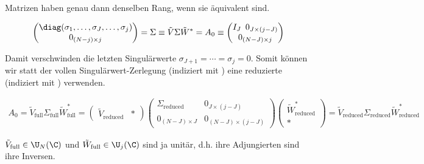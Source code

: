 Matrizen haben genau dann denselben Rang, wenn sie äquivalent sind.

\begin{align*}
    \begin{pmatrix}
        \diag(\sigma_1, \dots, \sigma_J, \dots, \sigma_j) \\
        0_{(N - j) \times j}
    \end{pmatrix}
    =
    \Sigma
    \equiv
    \tilde V \Sigma \tilde W^\ast
    =
    A_0
    \equiv
    \begin{pmatrix}
        I_J \enspace 0_{J \times (j - J)} \\ 0_{(N - J) \times j}
    \end{pmatrix}
\end{align*}

Damit verschwinden die letzten Singulärwerte $\sigma_{J+1} = \cdots = \sigma_j = 0$.
Somit können wir statt der vollen Singulärwert-Zerlegung (indiziert mit ) eine reduzierte (indiziert mit ) verwenden.

\begin{align*}
    A_0
    =
    \tilde V_\mathrm{full} \Sigma_\mathrm{full} \tilde W_\mathrm{full}^\ast
    =
    \begin{pmatrix}
        \tilde V_\mathrm{reduced} & \ast
    \end{pmatrix}
    \begin{pmatrix}
        \Sigma_\mathrm{reduced} & 0_{J \times (j - J)}       \\
        0_{(N - J) \times J}    & 0_{(N - J) \times (j - J)}
    \end{pmatrix}
    \begin{pmatrix}
        \tilde W_\mathrm{reduced}^\ast \\ \ast
    \end{pmatrix}
    =
    \tilde V_\mathrm{reduced} \Sigma_\mathrm{reduced} \tilde W_\mathrm{reduced}^\ast
\end{align*}

$\tilde V_\mathrm{full} \in \U_N(\C)$ und $\tilde W_\mathrm{full} \in \U_j(\C)$ sind ja unitär, d.h. ihre Adjungierten sind ihre Inversen.

